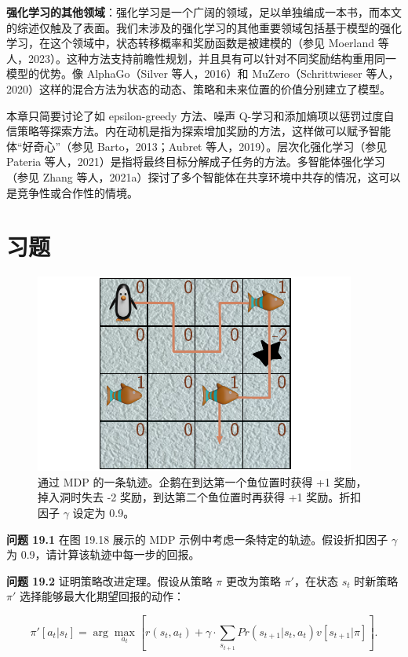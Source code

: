 \documentclass[lang=cn,newtx,10pt,scheme=chinese]{elegantbook}
\begin{document}
\textbf{强化学习的其他领域}：强化学习是一个广阔的领域，足以单独编成一本书，而本文的综述仅触及了表面。我们未涉及的强化学习的其他重要领域包括基于模型的强化学习，在这个领域中，状态转移概率和奖励函数是被建模的（参见 Moerland 等人，2023）。这种方法支持前瞻性规划，并且具有可以针对不同奖励结构重用同一模型的优势。像 AlphaGo（Silver 等人，2016）和 MuZero（Schrittwieser 等人，2020）这样的混合方法为状态的动态、策略和未来位置的价值分别建立了模型。

本章只简要讨论了如 epsilon-greedy 方法、噪声 Q-学习和添加熵项以惩罚过度自信策略等探索方法。内在动机是指为探索增加奖励的方法，这样做可以赋予智能体“好奇心”（参见 Barto，2013；Aubret 等人，2019）。层次化强化学习（参见 Pateria 等人，2021）是指将最终目标分解成子任务的方法。多智能体强化学习（参见 Zhang 等人，2021a）探讨了多个智能体在共享环境中共存的情况，这可以是竞争性或合作性的情境。


\section{习题}

\begin{figure}[ht!]
\centering
\includegraphics[width=0.7\linewidth]{PDFFigures/UDLChap19PDF/ReinforceProbReturn.pdf}
\caption{通过 MDP 的一条轨迹。企鹅在到达第一个鱼位置时获得 +1 奖励，掉入洞时失去 -2 奖励，到达第二个鱼位置时再获得 +1 奖励。折扣因子 \(\gamma\) 设定为 0.9。}
\end{figure}

\textbf{问题 19.1} 在图 19.18 展示的 MDP 示例中考虑一条特定的轨迹。假设折扣因子 \(\gamma\) 为 0.9，请计算该轨迹中每一步的回报。

\textbf{问题 19.2} 证明策略改进定理。假设从策略 \(\pi\) 更改为策略 \(\pi'\)，在状态 \(s_t\) 时新策略 \(\pi'\) 选择能够最大化期望回报的动作：

\begin{equation}
\pi'[a_t|s_t] = \arg\max_{a_t} \left[ r(s_t, a_t) + \gamma \cdot \sum_{s_{t+1}} Pr(s_{t+1} | s_t, a_t)v[s_{t+1} | \pi] \right]. 
\end{equation}
\end{document}
